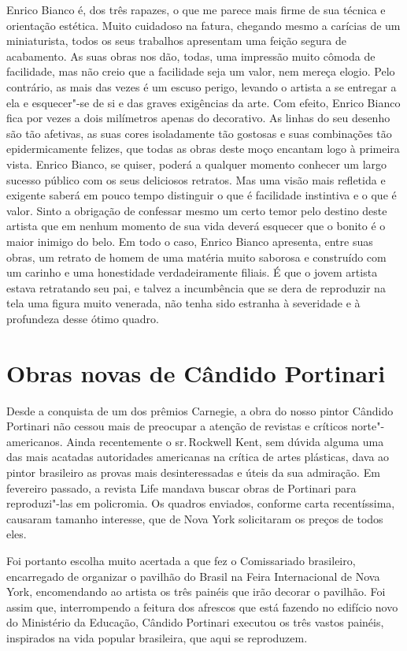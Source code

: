 Enrico Bianco é, dos três rapazes, o que me parece mais firme de sua
técnica e orientação estética. Muito cuidadoso na fatura, chegando mesmo
a carícias de um miniaturista, todos os seus trabalhos apresentam uma
feição segura de acabamento. As suas obras nos dão, todas, uma impressão
muito cômoda de facilidade, mas não creio que a facilidade seja um
valor, nem mereça elogio. Pelo contrário, as mais das vezes é um escuso
perigo, levando o artista a se entregar a ela e esquecer"-se de si e das
graves exigências da arte. Com efeito, Enrico Bianco fica por vezes a
dois milímetros apenas do decorativo. As linhas do seu desenho são tão
afetivas, as suas cores isoladamente tão gostosas e suas combinações tão
epidermicamente felizes, que todas as obras deste moço encantam logo à
primeira vista. Enrico Bianco, se quiser, poderá a qualquer momento
conhecer um largo sucesso público com os seus deliciosos retratos. Mas
uma visão mais refletida e exigente saberá em pouco tempo distinguir o
que é facilidade instintiva e o que é valor. Sinto a obrigação de
confessar mesmo um certo temor pelo destino deste artista que em nenhum
momento de sua vida deverá esquecer que o bonito é o maior inimigo do
belo. Em todo o caso, Enrico Bianco apresenta, entre suas obras, um
retrato de homem de uma matéria muito saborosa e construído com um
carinho e uma honestidade verdadeiramente filiais. É que o jovem artista
estava retratando seu pai, e talvez a incumbência que se dera de
reproduzir na tela uma figura muito venerada, não tenha sido estranha à
severidade e à profundeza desse ótimo quadro.

\chapter{Obras novas de Cândido Portinari}

Desde a conquista de um dos prêmios Carnegie, a obra do nosso pintor
Cândido Portinari não cessou mais de preocupar a atenção de revistas e
críticos norte"-americanos. Ainda recentemente o sr.\,Rockwell Kent, sem
dúvida alguma uma das mais acatadas autoridades americanas na crítica de
artes plásticas, dava ao pintor brasileiro as provas mais
desinteressadas e úteis da sua admiração. Em fevereiro passado, a
revista Life mandava buscar obras de Portinari para reproduzi"-las em
policromia. Os quadros enviados, conforme carta recentíssima, causaram
tamanho interesse, que de Nova York solicitaram os preços de todos eles.

Foi portanto escolha muito acertada a que fez o Comissariado brasileiro,
encarregado de organizar o pavilhão do Brasil na Feira Internacional de
Nova York, encomendando ao artista os três painéis que irão decorar o
pavilhão. Foi assim que, interrompendo a feitura dos afrescos que está
fazendo no edifício novo do Ministério da Educação, Cândido Portinari
executou os três vastos painéis, inspirados na vida popular brasileira,
que aqui se reproduzem.

